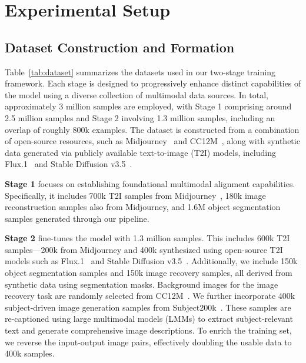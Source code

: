 \section{Experimental Setup}
\label{app:exp_detail}


\subsection{Dataset Construction and Formation}
\label{app:data_form}

Table~\ref{tab:dataset} summarizes the datasets used in our two-stage training framework. Each stage is designed to progressively enhance distinct capabilities of the model using a diverse collection of multimodal data sources. In total, approximately 3 million samples are employed, with Stage 1 comprising around 2.5 million samples and Stage 2 involving 1.3 million samples, including an overlap of roughly 800k examples.
The dataset is constructed from a combination of open-source resources, such as Midjourney~\citep{midjourney-niji-1m-llavanext} and CC12M~\citep{changpinyo2021cc12m}, along with synthetic data generated via publicly available text-to-image (T2I) models, including Flux.1~\citep{flux} and Stable Diffusion v3.5~\citep{2024SD3}.

\textbf{Stage 1} focuses on establishing foundational multimodal alignment capabilities. Specifically, it includes 700k T2I samples from Midjourney~\citep{midjourney-niji-1m-llavanext}, 180k image reconstruction samples also from Midjourney, and 1.6M object segmentation samples generated through our pipeline.

\textbf{Stage 2} fine-tunes the model with 1.3 million samples. This includes 600k T2I samples—200k from Midjourney and 400k synthesized using open-source T2I models such as Flux.1~\citep{flux} and Stable Diffusion v3.5~\citep{2024SD3}. Additionally, we include 150k object segmentation samples and 150k image recovery samples, all derived from synthetic data using segmentation masks. Background images for the image recovery task are randomly selected from CC12M~\citep{changpinyo2021cc12m}.
We further incorporate 400k subject-driven image generation samples from Subject200k~\citep{OminiControl}. These samples are re-captioned using large multimodal models (LMMs) to extract subject-relevant text and generate comprehensive image descriptions. To enrich the training set, we reverse the input-output image pairs, effectively doubling the usable data to 400k samples.




